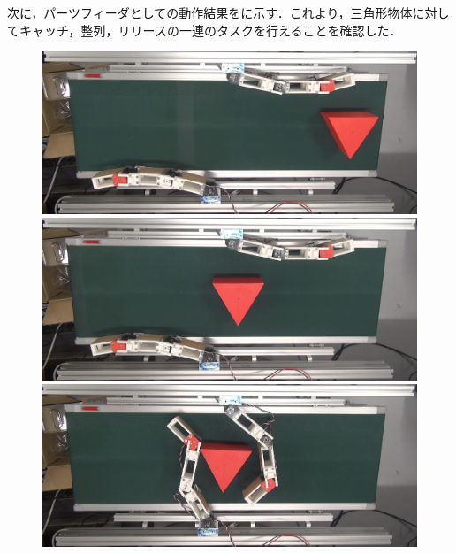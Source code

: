 \documentclass[a4paper,twoside,12pt,papersize, dvipdfmx]{iirthesis}
\begin{document}
次に，パーツフィーダとしての動作結果をに示す．これより，三角形物体に対してキャッチ，整列，リリースの一連のタスクを行えることを確認した．
\begin{figure}[hb]
\centering
\begin{minipage}{0.49\hsize}
\includegraphics[width=0.98\hsize]{fig/4-manipulation-result/Triangle/3-1.jpg}
\subcaption{}
\end{minipage}\hfill
\begin{minipage}{0.49\hsize}
\includegraphics[width=0.98\hsize]{fig/4-manipulation-result/Triangle/3-2.jpg}
\subcaption{}
\end{minipage}\hfill
\begin{minipage}{0.49\hsize}
\includegraphics[width=0.98\hsize]{fig/4-manipulation-result/Triangle/3-3.jpg}
\subcaption{}
\end{minipage}\hfill
\begin{minipage}{0.49\hsize}

\end{minipage}
\end{figure}
\end{document}
